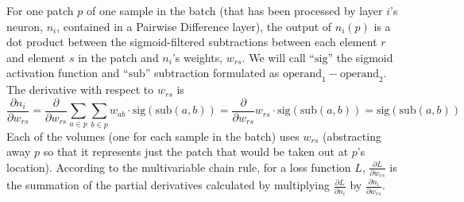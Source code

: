 For one patch $p$ of one sample in the batch (that has been processed by layer $i$'s neuron, $n_i$,
contained in a Pairwise Difference layer), the output of $n_i(p)$ is a dot product between the
sigmoid-filtered subtractions between each element $r$ and element $s$ in the patch and $n_i$'s
weights, $w_{rs}$. We will call ``$\text{sig}$'' the sigmoid activation function and
``$\text{sub}$'' subtraction formulated as $\text{operand}_1 - \text{operand}_2$. The derivative
with respect to $w_{rs}$ is
\[
    \frac{\partial n_i}{\partial w_{rs}}
    = \frac{\partial}{\partial w_{rs}}  \sum_{a \in p} \sum_{b \in p} w_{ab} \cdot \text{sig}(\text{sub}(a, b))
    = \frac{\partial}{\partial w_{rs}}  w_{rs} \cdot \text{sig}(\text{sub}(a, b))
    = \text{sig}(\text{sub}(a, b))
\]
Each of the volumes (one for each sample in the batch) uses $w_{rs}$ (abstracting away $p$ so that
it represents just the patch that would be taken out at $p$'s location). According to the multivariable
chain rule, for a loss function $L$, $\frac{\partial L}{\partial w_{rs}}$ is the summation of the
partial derivatives calculated by multiplying $\frac{\partial L}{\partial n_i}$ by
$\frac{\partial n_i}{\partial w_{rs}}$.

